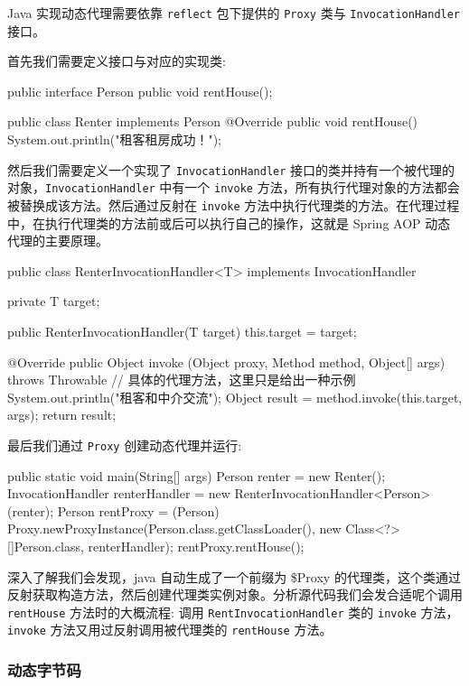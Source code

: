 Java 实现动态代理需要依靠 \texttt{reflect} 包下提供的 \texttt{Proxy} 类与 \texttt{InvocationHandler} 接口。

首先我们需要定义接口与对应的实现类:

\begin{Java}
public interface Person {
    public void rentHouse();
}

public class Renter implements Person {
    @Override
    public void rentHouse() {
        System.out.println("租客租房成功！");
    }
}
\end{Java}

然后我们需要定义一个实现了 \texttt{InvocationHandler} 接口的类并持有一个被代理的对象，\texttt{InvocationHandler} 中有一个 \texttt{invoke} 方法，所有执行代理对象的方法都会被替换成该方法。然后通过反射在 \texttt{invoke} 方法中执行代理类的方法。在代理过程中，在执行代理类的方法前或后可以执行自己的操作，这就是 Spring AOP 动态代理的主要原理。

\begin{Java}
public class RenterInvocationHandler<T> implements InvocationHandler {
    private T target;

    public RenterInvocationHandler(T target) {
        this.target = target;
    }

    @Override
    public Object invoke (Object proxy, Method method, Object[] args) throws Throwable {
        // 具体的代理方法，这里只是给出一种示例
        System.out.println("租客和中介交流");
        Object result = method.invoke(this.target, args);
        return result;
    }
}
\end{Java}

最后我们通过 \texttt{Proxy} 创建动态代理并运行:

\begin{Java}
public static void main(String[] args) {
    Person renter = new Renter();
    InvocationHandler renterHandler = new RenterInvocationHandler<Person>(renter);
    Person rentProxy = (Person) Proxy.newProxyInstance(Person.class.getClassLoader(),
            new Class<?>[]{Person.class}, renterHandler);
    rentProxy.rentHouse();
}
\end{Java}

深入了解我们会发现，java 自动生成了一个前缀为 \$Proxy 的代理类，这个类通过反射获取构造方法，然后创建代理类实例对象。分析源代码我们会发合适呢个调用 \texttt{rentHouse} 方法时的大概流程: 调用 \texttt{RentInvocationHandler} 类的 \texttt{invoke} 方法，\texttt{invoke} 方法又用过反射调用被代理类的 \texttt{rentHouse} 方法。

\subsubsection{动态字节码}

